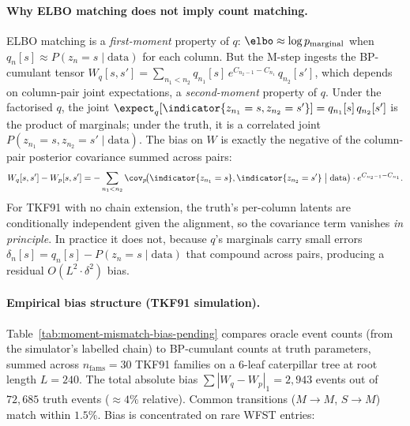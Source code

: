\paragraph{Why ELBO matching does not imply count matching.}
ELBO matching is a \emph{first-moment} property of $q$: $\elbo
\approx \log p_{\text{marginal}}$ when $q_n[s] \approx
P(z_n = s \mid \text{data})$ for each column.  But the M-step
ingests the BP-cumulant tensor
$W_q[s, s'] = \sum_{n_1 < n_2} q_{n_1}[s]\,e^{C_{n_2 - 1} - C_{n_1}}\,
q_{n_2}[s']$, which depends on column-pair joint expectations, a
\emph{second-moment} property of $q$.  Under the factorised $q$, the
joint
$\expect_q[\indicator{z_{n_1} = s, z_{n_2} = s'}] = q_{n_1}[s]\,
q_{n_2}[s']$ is the product of marginals; under the truth, it is a
correlated joint $P(z_{n_1} = s, z_{n_2} = s' \mid \text{data})$.
The bias on $W$ is exactly the negative of the column-pair
posterior covariance summed across pairs:
\begin{equation}
\label{eq:cumulant-bias-pending}
W_q[s, s'] - W_p[s, s']
= -\sum_{n_1 < n_2} \cov_p\!\bigl(\indicator{z_{n_1} = s},
   \indicator{z_{n_2} = s'} \bigm| \text{data}\bigr) \cdot
   e^{C_{n_2 - 1} - C_{n_1}}.
\end{equation}
For TKF91 with no chain extension, the truth's per-column latents
are conditionally independent given the alignment, so the
covariance term vanishes \emph{in principle}.  In practice it does
not, because $q$'s marginals carry small errors $\delta_n[s] =
q_n[s] - P(z_n = s \mid \text{data})$ that compound across pairs,
producing a residual $O(L^2 \cdot \delta^2)$ bias.

\paragraph{Empirical bias structure (TKF91 simulation).}
Table~\ref{tab:moment-mismatch-bias-pending} compares oracle event counts
(from the simulator's labelled chain) to BP-cumulant counts at
truth parameters, summed across $n_{\text{fams}} = 30$ TKF91
families on a 6-leaf caterpillar tree at root length $L = 240$.
The total absolute bias $\sum |W_q - W_p|_1 = 2{,}943$ events out
of $72{,}685$ truth events ($\approx 4\%$ relative).  Common
transitions ($M \to M$, $S \to M$) match within $1.5\%$.  Bias is
concentrated on rare WFST entries:

